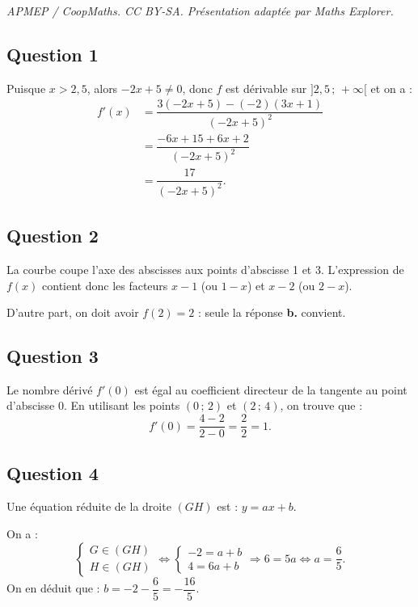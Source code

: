 \documentclass[10pt]{article}
\begin{document}
\noindent\textit{APMEP / CoopMaths. CC BY-SA. Présentation adaptée par Maths Explorer.}\par\medskip
\subsection*{Question 1}

Puisque \( x > 2{,}5 \), alors \( -2x + 5 \neq 0 \), donc \( f \) est dérivable sur \( ]2{,}5 \,;\, +\infty[ \) et on a :
\begin{align*}
f'(x) &= \dfrac{3(-2x + 5) - (-2)(3x + 1)}{(-2x + 5)^2} \\
&= \dfrac{-6x + 15 + 6x + 2}{(-2x + 5)^2} \\
&= \dfrac{17}{(-2x + 5)^2}.
\end{align*}

\subsection*{Question 2}

La courbe coupe l'axe des abscisses aux points d'abscisse 1 et 3. L'expression de \( f(x) \) contient donc les facteurs \( x - 1 \) (ou \( 1 - x \)) et \( x - 2 \) (ou \( 2 - x \)).

D'autre part, on doit avoir \( f(2) = 2 \) : seule la réponse \textbf{b.} convient.

\subsection*{Question 3}

Le nombre dérivé \( f'(0) \) est égal au coefficient directeur de la tangente au point d'abscisse 0. En utilisant les points \( (0\,;\,2) \) et \( (2\,;\,4) \), on trouve que :
\[
f'(0) = \dfrac{4 - 2}{2 - 0} = \dfrac{2}{2} = 1.
\]

\subsection*{Question 4}

Une équation réduite de la droite \( (GH) \) est : \( y = ax + b \).

On a :
\[
\begin{cases}
G \in (GH) \\
H \in (GH)
\end{cases}
\iff 
\begin{cases}
-2 = a + b \\
4 = 6a + b
\end{cases}
\Rightarrow 6 = 5a \iff a = \dfrac{6}{5}.
\]
On en déduit que : \( b = -2 - \dfrac{6}{5} = -\dfrac{16}{5} \).
\end{document}
